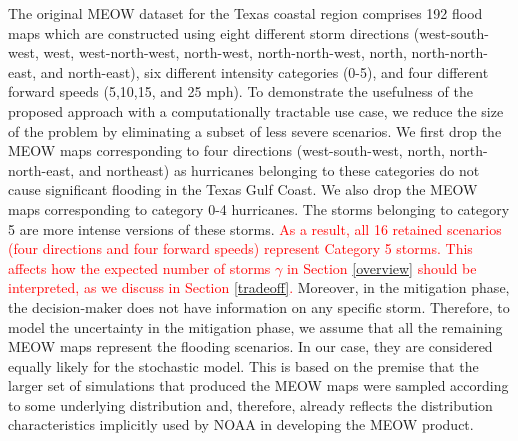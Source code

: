 \documentclass[authoryear,preprint,review,12pt]{elsarticle}\usepackage{amssymb}
\begin{document}
The original MEOW dataset for the Texas coastal region comprises 192 flood maps which are constructed using eight different storm directions (west-south-west, west, west-north-west, north-west, north-north-west, north, north-north-east, and north-east), six different intensity categories (0-5), and four different forward speeds (5,10,15, and 25 mph). To demonstrate the usefulness of the proposed approach with a computationally tractable use case, we reduce the size of the problem by eliminating a subset of less severe scenarios. We first drop the MEOW maps corresponding to four directions (west-south-west, north, north-north-east, and northeast) as hurricanes belonging to these categories do not cause significant flooding in the Texas Gulf Coast. We also drop the MEOW maps corresponding to category 0-4 hurricanes. The storms belonging to category 5 are more intense versions of these storms. \textcolor{red}{As a result, all 16 retained scenarios (four directions and four forward speeds) represent Category 5 storms. This affects how the expected number of storms $\gamma$ in Section \ref{overview} should be interpreted, as we discuss in Section \ref{tradeoff}.}
Moreover, in the mitigation phase, the decision-maker does not have information on any specific storm. Therefore, to model the uncertainty in the mitigation phase, we assume that all the remaining MEOW maps represent the flooding scenarios. In our case, they are considered equally likely for the stochastic model. This is based on the premise that the larger set of simulations that produced the MEOW maps were sampled according to some underlying distribution and, therefore, already reflects the distribution characteristics implicitly used by NOAA in developing the MEOW product. 
\end{document}
